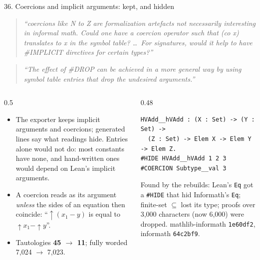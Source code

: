 \documentclass[10pt,aspectratio=169]{beamer}
\newcommand{\bad}[1]{\textcolor{warn}{#1}}
\newcommand{\ok}[1]{\textcolor{good}{#1}}
\newcommand{\commit}[1]{\texttt{\footnotesize #1}}
\newcommand{\prompt}[1]{\begin{quote}\small\itshape ``#1''\end{quote}}
\begin{document}
\begin{frame}[fragile]{36. Coercions and implicit arguments: kept, and hidden}
  \footnotesize
  \prompt{coercions like N to Z are formalization artefacts not necessarily interesting in
  informal math. Could one have a coercion operator such that (co x) translates to x in the symbol
  table? \ldots\ For signatures, would it help to have \#IMPLICIT directives for certain types?}
  \prompt{The effect of \#DROP can be achieved in a more general way by using symbol table
  entries that drop the undesired arguments.}
  \begin{columns}[T]
    \begin{column}{0.5\textwidth}
      \begin{itemize}
        \item The exporter keeps implicit arguments and coercions; generated lines say what
              readings hide. Entries alone would not do: \bad{most constants have none}, and
              hand-written ones would depend on Lean's implicit arguments.
        \item A coercion reads as its argument \emph{unless} the sides of an equation then
              coincide: ``\ok{$\uparrow(x_1 - y)$ is equal to $\uparrow x_1 - \uparrow y$}''.
        \item Tautologies \textbf{45 $\to$ 11}; fully worded 7,024 $\to$ 7,023.
      \end{itemize}
    \end{column}
    \begin{column}{0.48\textwidth}
\begin{lstlisting}
HVAdd__hVAdd : (X : Set) -> (Y : Set) ->
  (Z : Set) -> Elem X -> Elem Y -> Elem Z.
#HIDE HVAdd__hVAdd 1 2 3
#COERCION Subtype__val 3
\end{lstlisting}
      \scriptsize Found by the rebuilds: Lean's \texttt{Eq} got a \texttt{\#HIDE} that
      \bad{hid Informath's \texttt{Eq}}; finite-set $\subseteq$ lost its type; proofs over
      3,000 characters (now 6,000) were dropped.
      mathlib-informath \commit{1e60df2}, informath \commit{64c2bf9}.
    \end{column}
  \end{columns}
\end{frame}
\end{document}
